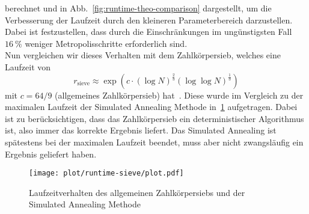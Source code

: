 berechnet und in Abb.~\ref{fig:runtime-theo-comparison} dargestellt, um die Verbesserung der Laufzeit durch den kleineren Parameterbereich darzustellen. Dabei ist festzustellen, dass durch die Einschränkungen im ungünstigsten Fall $\SI{16}{\percent}$ weniger Metropolisschritte erforderlich sind. \\
Nun vergleichen wir dieses Verhalten mit dem Zahlkörpersieb, welches eine Laufzeit von 
\begin{equation}
		r_\mathrm{sieve}\approx\exp\left(c\cdot{\left(\log N\right)}^\frac{2}{3}{\left(\log\log N\right)}^\frac{1}{3}\right)\label{eq:runtime-sieve}
\end{equation}
mit $c=64/9$ (allgemeines Zahlkörpersieb) hat~\parencite{pomerance}. Diese wurde im Vergleich zu der maximalen Laufzeit der Simulated Annealing Methode in~\ref{fig:runtime-sieve} aufgetragen. Dabei ist zu berücksichtigen, dass das Zahlkörpersieb ein deterministischer Algorithmus ist, also immer das korrekte Ergebnis liefert. Das Simulated Annealing ist spätestens bei der maximalen Laufzeit beendet, muss aber nicht zwangsläufig ein Ergebnis geliefert haben.
\begin{figure}[ht]
		\centering
		\texttt{[image: plot/runtime-sieve/plot.pdf]}
		\caption{Laufzeitverhalten des allgemeinen Zahlkörpersiebs und der Simulated Annealing Methode}\label{fig:runtime-sieve}
\end{figure}
